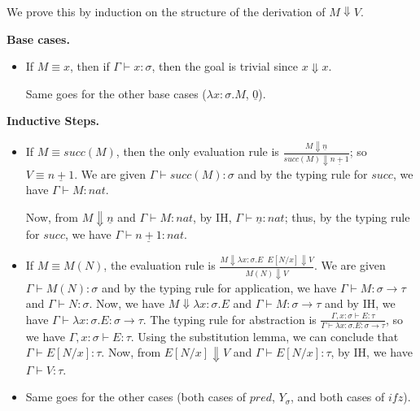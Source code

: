     We prove this by induction on the structure of the derivation of $M \Downarrow V$.

    \textbf{Base cases.}
    \begin{itemize}
        \item If $M \equiv x$, then if $\Gamma \vdash x:\sigma$, then the goal is trivial since $x \Downarrow x$.
        
        Same goes for the other base cases ($\lambda x:\sigma.M$, $\underline{0}$).
    \end{itemize}  
    \textbf{Inductive Steps.}
    \begin{itemize}
        \item If $M \equiv succ(M)$, then the only evaluation rule is $\frac{M \Downarrow \underline{n}}{succ(M) \Downarrow \underline{n+1}}$; so $V \equiv \underline{n+1}$.
              We are given $\Gamma \vdash succ(M):\sigma$ and by the typing rule for $succ$, we have $\Gamma \vdash M:nat$.

              Now, from $M \Downarrow \underline{n}$ and $\Gamma \vdash M:nat$, by IH, $\Gamma \vdash \underline{n}:nat$; thus, by the typing rule for $succ$, 
              we have $\Gamma \vdash \underline{n+1}:nat$.

        \item If $M \equiv M(N)$, the evaluation rule is $\frac{M \Downarrow \lambda x:\sigma.E \;\; E[N/x] \Downarrow V}{M(N) \Downarrow V}$.
              We are given $\Gamma \vdash M(N):\sigma$ and by the typing rule for application, we have $\Gamma \vdash M:\sigma \to \tau$ and $\Gamma \vdash N:\sigma$.
              Now, we have $M \Downarrow \lambda x:\sigma.E$ and $\Gamma \vdash M:\sigma \to \tau$ and by IH, we have $\Gamma \vdash \lambda x:\sigma.E:\sigma \to \tau$.
              The typing rule for abstraction is $\frac{\Gamma, x:\sigma \vdash E:\tau}{\Gamma \vdash \lambda x:\sigma.E:\sigma \to \tau}$, so we have $\Gamma, x:\sigma \vdash E:\tau$.
              Using the substitution lemma, we can conclude that $\Gamma \vdash E[N/x]:\tau$. Now, from $E[N/x] \Downarrow V$ and $\Gamma \vdash E[N/x]:\tau$, by IH, we have $\Gamma \vdash V:\tau$.

        \item Same goes for the other cases (both cases of $pred$, $Y_\sigma$, and both cases of $ifz$).
    \end{itemize}